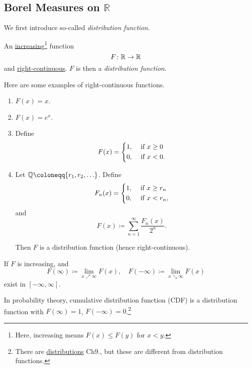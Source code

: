 \subsection{Borel Measures on \(\mathbb{R}\)}
We first introduce so-called \emph{distribution function}.

\begin{definition}\label{def:distribution-function}
	An \underline{increasing}\footnote{Here, increasing means \(F(x)\leq F(y)\) for \(x<y\).} function
	\[
		F\colon \mathbb{\MakeUppercase{R}} \to \mathbb{\MakeUppercase{R}}
	\]
	and \underline{right-continuous}. \(F\) is then a \emph{distribution function}.
\end{definition}

\begin{eg}
	Here are some examples of right-continuous functions.
	\begin{enumerate}
		\item \(F(x) = x\).
		\item \(F(x) = e^x\).
		\item Define
		      \[
			      F(x) = \begin{dcases}
				      1, & \text{ if } x\geq 0 \\
				      0, & \text{ if } x < 0.
			      \end{dcases}
		      \]
		\item Let \(\mathbb{\MakeUppercase{Q}} \coloneqq \{r_1, r_2, \ldots  \}\). Define
		      \[
			      F_n(x) = \begin{dcases}
				      1, & \text{ if } x\geq r_n \\
				      0, & \text{ if } x < r_n,
			      \end{dcases}
		      \]
		      and
		      \[
			      F(x) \coloneqq \sum\limits_{n=1}^{\infty} \frac{F_n(x)}{2^n}.
		      \]

		      Then \(F\) is a distribution function (hence right-continuous).
	\end{enumerate}
\end{eg}
\begin{note}
	If \(F\) is increasing, and
	\[
		F(\infty )\coloneqq \lim\limits_{x \nearrow \infty} F(x),\quad F(-\infty ) \coloneqq \lim\limits_{x \searrow \infty} F(x)
	\]
	exist in \([-\infty , \infty ]\).

	In probability theory, cumulative distribution function (CDF) is a distribution function with \(F(\infty ) = 1\), \(F(-\infty ) = 0\).\footnote{There are \underline{distributions} \cite{folland1999real} Ch9., but these are different from distribution functions.}
\end{note}

